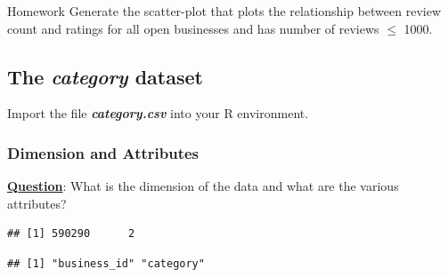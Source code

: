 \documentclass[12pt]{book}\usepackage{knitr}
\begin{document}
\begin{DIY}{Homework}
\noindent Generate the scatter-plot that plots the relationship between review count and ratings for all open businesses and has number of reviews $\leq$ 1000.
\end{DIY}

\newpage
\subsection{The \textbf{\emph{category}} dataset}
\noindent Import the file \emph{\textbf{category.csv}} into your R environment.  


\subsubsection{Dimension and Attributes}
\noindent \textbf{\underline{Question}}: What is the dimension of the data and what are the various attributes?
\begin{knitrout}
\color{fgcolor}\begin{kframe}
\begin{alltt}
\end{alltt}
\begin{verbatim}
## [1] 590290      2
\end{verbatim}
\begin{alltt}
\end{alltt}
\begin{verbatim}
## [1] "business_id" "category"
\end{verbatim}
\begin{alltt}
\end{alltt}
\end{kframe}
\end{knitrout}
\end{document}

